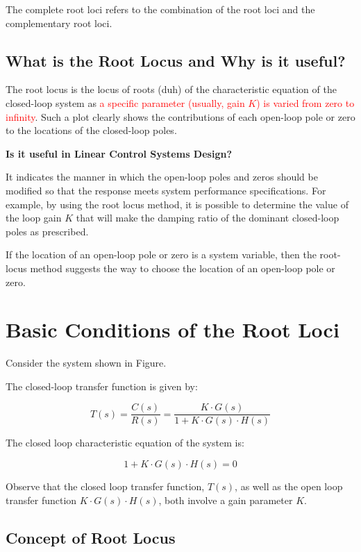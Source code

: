 \documentclass[
  14pt,
  a4paper,
  oneside,
  open=any,
  a4paper,
  14pt]{report}
\begin{document}
The complete root loci refers to the combination of the root loci and
the complementary root loci.

\subsection{What is the Root Locus and Why is it
useful?}\label{what-is-the-root-locus-and-why-is-it-useful}

The root locus is the locus of roots (duh) of the characteristic
equation of the closed-loop system as \textcolor{red}{a specific
parameter (usually, gain \(K\)) is varied from zero to infinity}. Such a
plot clearly shows the contributions of each open-loop pole or zero to
the locations of the closed-loop poles.

\textbf{Is it useful in Linear Control Systems Design?}

It indicates the manner in which the open-loop poles and zeros should be
modified so that the response meets system performance specifications.
For example, by using the root locus method, it is possible to determine
the value of the loop gain \(K\) that will make the damping ratio of the
dominant closed-loop poles as prescribed.

If the location of an open-loop pole or zero is a system variable, then
the root-locus method suggests the way to choose the location of an
open-loop pole or zero.

\section{Basic Conditions of the Root
Loci}\label{basic-conditions-of-the-root-loci}

Consider the system shown in Figure.

The closed-loop transfer function is given by:

\[
    T(s) = \dfrac{C(s)}{R(s)} = \dfrac{K\cdot G(s)}{1+K\cdot G(s) \cdot H(s)}
\]

The closed loop characteristic equation of the system is:

\[
    1+K\cdot G(s) \cdot H(s) = 0
\]

Observe that the closed loop transfer function, \(T(s)\), as well as the
open loop transfer function \(K\cdot G(s)\cdot H(s)\), both involve a
gain parameter \(K\).

\subsection{Concept of Root Locus}\label{concept-of-root-locus}
\end{document}
